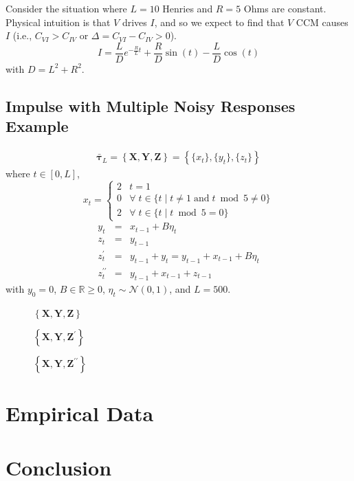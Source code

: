 \documentclass[a4paper,11pt,twocolumn]{article}
\begin{document}
Consider the situation where $L=10$ Henries and $R=5$ Ohms are constant.  Physical intuition is that $V$ drives $I$, and so we expect to find that $V$ CCM causes $I$ (i.e., $C_{VI}>C_{IV}$ or $\Delta = C_{VI}-C_{IV} > 0$). 
\begin{equation}
I = \frac{L}{D}e^{-\frac{R}{L}t}+\frac{R}{D}\sin(t)-\frac{L}{D}\cos(t)
\end{equation}
with $D = L^2 + R^2$.   


\subsection{Impulse with Multiple Noisy Responses Example}
\begin{eqnarray}
\bar{\mathbf{\tau}}_L = \left\{\mathbf{X},\mathbf{Y},\mathbf{Z}\right\} = \left\{\{x_t\},\{y_t\},\{z_t\}\right\}
\end{eqnarray}
where $t\in[0,L]$,
\begin{equation*}
x_t = \left\{
  \begin{array}{lr}
    2 & t = 1\\
    0 & \forall\; t\in\{t\;|\;t\neq 1 \;\mathrm{and}\; t\bmod 5 \neq 0\}\\
    2 & \forall\; t\in\{t\;|\;t\bmod 5 = 0\}
  \end{array}
\right.
\end{equation*}
\begin{eqnarray*}
y_t &=& x_{t-1} + B\eta_t\\
z_t &=& y_{t-1}\\
z_t^\prime &=& y_{t-1} + y_t = y_{t-1} + x_{t-1} + B\eta_t\\
z_t^{\prime\prime} &=& y_{t-1} + x_{t-1} + z_{t-1}
\end{eqnarray*}
with $y_0 = 0$, $B\in\mathbb{R}\ge 0$, $\eta_t\sim\mathcal{N}\left(0,1\right)$, and $L=500$.
\begin{figure}[ht]
\caption{$\left\{\mathbf{X},\mathbf{Y},\mathbf{Z}\right\}$}
\end{figure}
\begin{figure}[ht]
\caption{$\left\{\mathbf{X},\mathbf{Y},\mathbf{Z}^\prime\right\}$}
\end{figure}
\begin{figure}[ht]
\caption{$\left\{\mathbf{X},\mathbf{Y},\mathbf{Z}^{\prime\prime}\right\}$}
\end{figure}

\section{Empirical Data}

\section{Conclusion}

%
%
\end{document}
